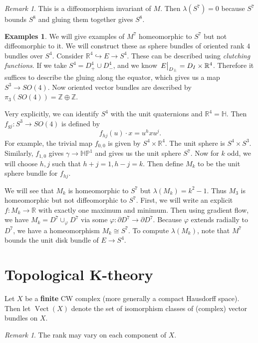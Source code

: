\documentclass[leqno, openany]{memoir}
\theoremstyle{definition}
\newtheorem{exms}[thm]{Examples}
\theoremstyle{remark}
\newtheorem{rmk}[thm]{Remark}
\theoremstyle{plain}
\theoremstyle{definition}
\theoremstyle{remark}
\newcommand{\R}{\mathbb{R}}
\renewcommand{\H}{\mathbb{H}}
\newcommand{\Z}{\mathbb{Z}}
\renewcommand{\P}{\mathbb{P}}
\DeclareMathOperator{\Vect}{Vect}
\begin{document}
\begin{rmk} This is a diffeomorphism invariant of $M$. Then $\lambda(S^7) = 0$
because $S^7$ bounds $S^8$ and gluing them together gives $S^8$.  \end{rmk}

\begin{exms} We will give examples of $M^7$ homeomorphic to $S^7$ but not
    diffeomorphic to it. We will construct these as sphere bundles of oriented
    rank $4$ bundles over $S^4$. Consider $\R^4 \hookrightarrow E \to S^4$.
    These can be described using \textit{clutching functions}. If we take $S^4
    = D_+^4 \cup D_-^4$, and we know $\eval{E}_{D_{\pm}} = D_I \times \R^4$.
    Therefore it suffices to describe the gluing along the equator, which gives
    us a map $S^3 \to SO(4)$. Now oriented vector bundles are described by
    $\pi_3(SO(4)) = \Z \oplus \Z$. 

    Very explicitly, we can identify $S^4$ with the unit quaternions and $\R^4
    = \H$. Then $f_{gj} \colon S^3 \to SO(4)$ is defined by \[ f_{hj}(u) \cdot
    x = u^h x u^j. \] For example, the trivial map $f_{0,0}$ is given by $S^4
    \times \R^4$. The unit sphere is $S^4 \times S^3$. Similarly, $f_{1,0}$
    gives $\gamma \to \H\P^1$ and gives us the unit sphere $S^7$. Now for $k$
    odd, we will choose $h,j$ such that $h+j=1, h-j=k$. Then define $M_k$ to be
    the unit sphere bundle for $f_{hj}$.

    We will see that $M_k$ is homeomorphic to $S^7$ but $\lambda(M_k) = k^2-1$.
Thus $M_3$ is homeomorphic but not diffeomorphic to $S^7$. First, we will write
an explicit $f \colon M_k \to \R$ with exactly one maximum and minimum. Then
using gradient flow, we have $M_k = D^7 \cup_{\varphi} D^7$ via some $\varphi
\colon \partial D^7 \to \partial D^7$. Because $\varphi$ extends radially to
$D^7$, we have a homeomorphism $M_k \cong S^7$. To compute $\lambda(M_k)$, note
that $M^7$ bounds the unit disk bundle of $E \to S^4$.  \end{exms}

\section{Topological K-theory}%

Let $X$ be a \textbf{finite} CW complex (more generally a compact Hausdorff
space). Then let $\Vect(X)$ denote the set of isomorphism classes of (complex)
vector bundles on $X$.

\begin{rmk} The rank may vary on each component of $X$.  \end{rmk}
\end{document}
